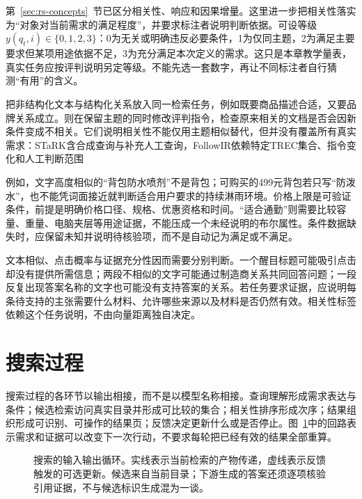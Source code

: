 第~\ref{sec:rs-concepts}~节已区分相关性、响应和因果增量。这里进一步把相关性落实为“对象对当前需求的满足程度”，并要求标注者说明判断依据。可设等级$y(q_t,i)\in\{0,1,2,3\}$：0为无关或明确违反必要条件，1为仅同主题，2为满足主要要求但某项用途依据不足，3为充分满足本次定义的需求。这只是本章教学量表，真实任务应按评判说明另定等级。不能先选一套数字，再让不同标注者自行猜测“有用”的含义。

\Needspace{130mm}
把非结构化文本与结构化关系放入同一检索任务，例如既要商品描述合适，又要品牌关系成立。则在保留主题的同时修改评判指令，检查原来相关的文档是否会因新条件变成不相关。它们说明相关性不能仅用主题相似替代，但并没有覆盖所有真实需求：STaRK含合成查询与补充人工查询，FollowIR依赖特定TREC集合、指令变化和人工判断范围

例如，文字高度相似的“背包防水喷剂”不是背包；可购买的499元背包若只写“防泼水”，也不能凭词面接近就判断适合用户要求的持续淋雨环境。价格上限是可验证条件，前提是明确价格口径、规格、优惠资格和时间。“适合通勤”则需要比较容量、重量、电脑夹层等用途证据，不能压成一个未经说明的布尔属性。条件数据缺失时，应保留未知并说明待核验项，而不是自动记为满足或不满足。

文本相似、点击概率与证据充分性因而需要分别判断。一个醒目标题可能吸引点击却没有提供所需信息；两段不相似的文字可能通过制造商关系共同回答问题；一段反复出现答案名称的文字也可能没有支持答案的关系。若任务要求证据，应说明每条待支持的主张需要什么材料、允许哪些来源以及材料是否仍然有效。相关性标签依赖这个任务说明，不由向量距离独自决定。

\section{搜索过程}
\label{sec:rs-search-process}

搜索过程的各环节以输出相接，而不是以模型名称相接。查询理解形成需求表达与条件；候选检索访问真实目录并形成可比较的集合；相关性排序形成次序；结果组织形成可识别、可操作的结果页；反馈决定更新什么或是否停止。图~\ref{fig:rs-search-cycle}中的回路表示需求和证据可以改变下一次行动，不要求每轮把已经有效的结果全部重算。

\begin{figure}[htbp]
 \centering
  
 \caption{搜索的输入输出循环。实线表示当前检索的产物传递，虚线表示反馈触发的可选更新。候选来自当前目录；下游生成的答案还须逐项核验引用证据，不与候选标识生成混为一谈。}
 \label{fig:rs-search-cycle}
\end{figure}


